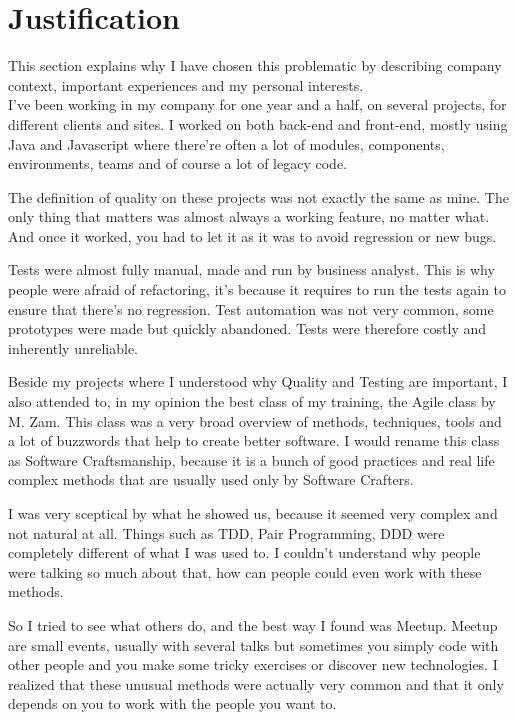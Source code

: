 \section{Justification}\label{sec:justification}
This section explains why I have chosen this problematic by describing
company context, important experiences and my personal interests. \\
I've been working in my company for one year and a half, on several
projects, for different clients and sites.
I worked on both back-end and front-end, mostly using Java and Javascript where
there're often a lot of modules, components, environments, teams and of course
a lot of legacy code.

The definition of quality on these projects was not exactly the same as mine.
The only thing that matters was almost always a working feature, no matter
what.
And once it worked, you had to let it as it was to avoid regression or new
bugs.

Tests were almost fully manual, made and run by business analyst.
This is why people were afraid of refactoring, it's because it requires to
run the tests again to ensure that there's no regression.
Test automation was not very common, some prototypes were made but quickly
abandoned.
Tests were therefore costly and inherently unreliable.

Beside my projects where I understood why Quality and Testing are
important, I also attended to, in my opinion the best class of my
training, the Agile class by M. Zam.
This class was a very broad overview of methods, techniques, tools and a
lot of buzzwords that help to create better software.
I would rename this class as Software Craftsmanship, because it is a
bunch of good practices and real life complex methods that are usually
used only by Software Crafters.

I was very sceptical by what he showed us, because it seemed very complex
and not natural at all.
Things such as TDD, Pair Programming, DDD were completely different of
what I was used to.
I couldn't understand why people were talking so much about that, how can
people could even work with these methods.

So I tried to see what others do, and the best way I found was Meetup.
Meetup are small events, usually with several talks but sometimes you
simply code with other people and you make some tricky exercises or
discover new technologies.
I realized that these unusual methods were actually very common and that
it only depends on you to work with the people you want to.

